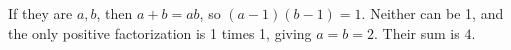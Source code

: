 If they are $a,b$, then $a+b=ab$, so $(a-1)(b-1)=1$. Neither can be 1, and the only positive factorization is 1 times 1, giving $a=b=2$. Their sum is $\boxed4$.
